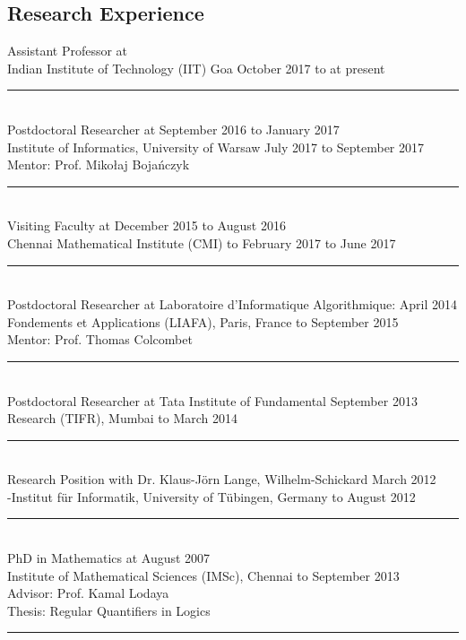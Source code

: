 \documentclass[margin]{res}
\begin{document}
\begin{resume}
\section{Research Experience} 
					Assistant Professor at \\
					Indian Institute of Technology (IIT) Goa \hfill October 2017 to at present \\
					\noindent\rule{13cm}{0.4pt} \\
					Postdoctoral Researcher at \hfill  \hfill September 2016 to January 2017 \\
					Institute of Informatics, University of Warsaw \hfill July 2017 to September 2017 \\
					Mentor: Prof. Miko\l{}aj Boja\'nczyk \\
					\noindent\rule{13cm}{0.4pt} \\
					Visiting Faculty at 	\hfill December 2015 to August 2016 \\
					Chennai Mathematical Institute (CMI)  \hfill to February 2017 to June 2017 \\
					\noindent\rule{13cm}{0.4pt} \\
					Postdoctoral Researcher  at Laboratoire d{'}Informatique Algorithmique: \hfill April 2014\\
					Fondements et Applications (LIAFA),	Paris, France \hfill to September 2015 \\
					Mentor: Prof. Thomas Colcombet \\
					\noindent\rule{13cm}{0.4pt} \\
					Postdoctoral Researcher  at Tata Institute of  Fundamental \hfill September 2013 \\
					Research (TIFR), Mumbai	\hfill	to March 2014
					\noindent\rule{13cm}{0.4pt} \\					
					Research Position with Dr. Klaus-J\"orn Lange, Wilhelm-Schickard \hfill March 2012\\
					-Institut f\"ur Informatik, University of T\"ubingen, Germany \hfill to August 2012 
					\noindent\rule{13cm}{0.4pt} \\
					PhD in Mathematics at \hfill August 2007\\
					Institute of Mathematical Sciences (IMSc), Chennai \hfill to September 2013\\
					Advisor: Prof. Kamal Lodaya  \\
					Thesis: Regular Quantifiers in Logics  \\
					\noindent\rule{13cm}{0.4pt} 



\end{resume}
\end{document}
